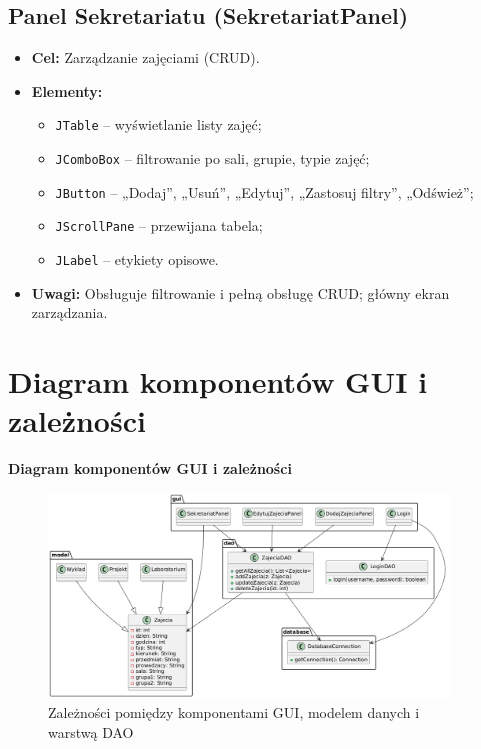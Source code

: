 \subsection {Panel Sekretariatu (SekretariatPanel)}

\begin{itemize}
    \item \textbf{Cel:} Zarządzanie zajęciami (CRUD).
    \item \textbf{Elementy:}
    \begin{itemize}
        \item \texttt{JTable} – wyświetlanie listy zajęć;
        \item \texttt{JComboBox} – filtrowanie po sali, grupie, typie zajęć;
        \item \texttt{JButton} – „Dodaj”, „Usuń”, „Edytuj”, „Zastosuj filtry”, „Odśwież”;
        \item \texttt{JScrollPane} – przewijana tabela;
        \item \texttt{JLabel} – etykiety opisowe.
    \end{itemize}
    \item \textbf{Uwagi:} Obsługuje filtrowanie i pełną obsługę CRUD; główny ekran zarządzania.
\end{itemize}

\section{Diagram komponentów GUI i zależności}
\vspace{1em}
\noindent\textbf{Diagram komponentów GUI i zależności}

\vspace{0.5em}
\begin{figure}[H]
    \centering
    \includegraphics[width=0.95\textwidth]{figures/diagram.png}
    \caption{Zależności pomiędzy komponentami GUI, modelem danych i warstwą DAO}
    \label{fig:diagram-gui}
\end{figure}
